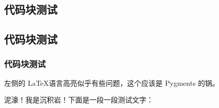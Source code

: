 \begin{multicols*}{2}
\section{ 代码块测试}

\subsection{ 代码块测试}

\subsubsection{ 代码块测试}





左侧的 \LaTeX 语言高亮似乎有些问题，这个应该是 Pygments 的锅\rlap。




泥濠！我是沉积岩！下面是一段一段测试文字：%
\codeinline[haskell]{lst = [x| x <- }
\codeinline[haskell]{['a'..'g']] -- by 沉积岩}\ 
\end{multicols*}

\begin{multicols*}{3}

\end{multicols*}

\newpage